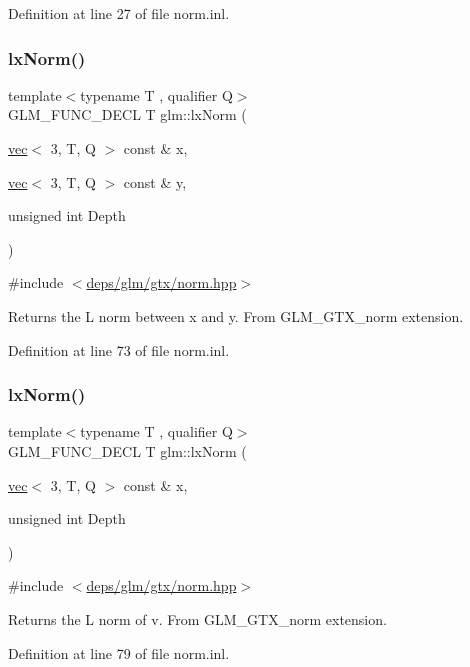 Definition at line 27 of file norm.\+inl.

\mbox{\label{group__gtx__norm_gacad23d30497eb16f67709f2375d1f66a}} 
\subsubsection{\texorpdfstring{lx\+Norm()}{lxNorm()}\hspace{0.1cm}{\footnotesize\ttfamily [1/2]}}
{\footnotesize\ttfamily template$<$typename T , qualifier Q$>$ \\
G\+L\+M\+\_\+\+F\+U\+N\+C\+\_\+\+D\+E\+CL T glm\+::lx\+Norm (\begin{DoxyParamCaption}\item[{\hyperlink{structglm_1_1vec}{vec}$<$ 3, T, Q $>$ const \&}]{x,  }\item[{\hyperlink{structglm_1_1vec}{vec}$<$ 3, T, Q $>$ const \&}]{y,  }\item[{unsigned int}]{Depth }\end{DoxyParamCaption})}



{\ttfamily \#include $<$\hyperlink{norm_8hpp}{deps/glm/gtx/norm.\+hpp}$>$}

Returns the L norm between x and y. From G\+L\+M\+\_\+\+G\+T\+X\+\_\+norm extension. 

Definition at line 73 of file norm.\+inl.

\mbox{\label{group__gtx__norm_gac61b6d81d796d6eb4d4183396a19ab91}} 
\subsubsection{\texorpdfstring{lx\+Norm()}{lxNorm()}\hspace{0.1cm}{\footnotesize\ttfamily [2/2]}}
{\footnotesize\ttfamily template$<$typename T , qualifier Q$>$ \\
G\+L\+M\+\_\+\+F\+U\+N\+C\+\_\+\+D\+E\+CL T glm\+::lx\+Norm (\begin{DoxyParamCaption}\item[{\hyperlink{structglm_1_1vec}{vec}$<$ 3, T, Q $>$ const \&}]{x,  }\item[{unsigned int}]{Depth }\end{DoxyParamCaption})}



{\ttfamily \#include $<$\hyperlink{norm_8hpp}{deps/glm/gtx/norm.\+hpp}$>$}

Returns the L norm of v. From G\+L\+M\+\_\+\+G\+T\+X\+\_\+norm extension. 

Definition at line 79 of file norm.\+inl.

